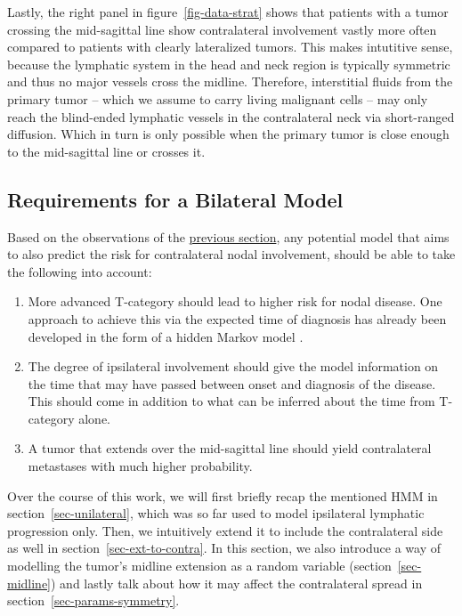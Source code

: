 \documentclass[
  sn-mathphys-num,
]{sn-jnl}
\providecommand{\tightlist}{%
  \setlength{\itemsep}{0pt}\setlength{\parskip}{0pt}}\usepackage{longtable,booktabs,array}
\begin{document}
Lastly, the right panel in figure~\ref{fig-data-strat} shows that
patients with a tumor crossing the mid-sagittal line show contralateral
involvement vastly more often compared to patients with clearly
lateralized tumors. This makes intutitive sense, because the lymphatic
system in the head and neck region is typically symmetric and thus no
major vessels cross the midline. Therefore, interstitial fluids from the
primary tumor -- which we assume to carry living malignant cells -- may
only reach the blind-ended lymphatic vessels in the contralateral neck
via short-ranged diffusion. Which in turn is only possible when the
primary tumor is close enough to the mid-sagittal line or crosses it.

\subsection{Requirements for a Bilateral Model}\label{sec-requirements}

Based on the observations of the \hyperref[sec-data-strat]{previous
section}, any potential model that aims to also predict the risk for
contralateral nodal involvement, should be able to take the following
into account:

\begin{enumerate}
\def\labelenumi{\arabic{enumi}.}
\tightlist
\item
  More advanced T-category should lead to higher risk for nodal disease.
  One approach to achieve this via the expected time of diagnosis has
  already been developed in the form of a hidden Markov model
  \citep{ludwig_hidden_2021}.
\item
  The degree of ipsilateral involvement should give the model
  information on the time that may have passed between onset and
  diagnosis of the disease. This should come in addition to what can be
  inferred about the time from T-category alone.
\item
  A tumor that extends over the mid-sagittal line should yield
  contralateral metastases with much higher probability.
\end{enumerate}

Over the course of this work, we will first briefly recap the mentioned
HMM in section~\ref{sec-unilateral}, which was so far used to model
ipsilateral lymphatic progression only. Then, we intuitively extend it
to include the contralateral side as well in
section~\ref{sec-ext-to-contra}. In this section, we also introduce a
way of modelling the tumor's midline extension as a random variable
(section~\ref{sec-midline}) and lastly talk about how it may affect the
contralateral spread in section~\ref{sec-params-symmetry}.
\end{document}
